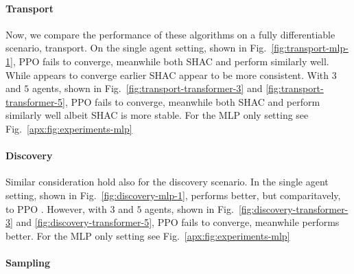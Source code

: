\paragraph{Transport}
Now, we compare the performance of these algorithms on a fully differentiable scenario, transport. On the single agent setting, shown in Fig.~\ref{fig:transport-mlp-1}, PPO fails to converge, meanwhile both SHAC and \fname{} perform similarly well. While \fname{} appears to converge earlier SHAC appear to be more consistent. With $3$ and $5$ agents, shown in Fig.~\ref{fig:transport-transformer-3} and \ref{fig:transport-transformer-5}, PPO fails to converge, meanwhile both SHAC and \fname{} perform similarly well albeit SHAC is more stable. For the MLP only setting see Fig.~\ref{apx:fig:experiments-mlp} 

\paragraph{Discovery}
Similar consideration hold also for the discovery scenario. In the single agent setting, shown in Fig.~\ref{fig:discovery-mlp-1}, \fname{} performs better, but comparitavely, to PPO . However, with $3$ and $5$ agents, shown in Fig.~\ref{fig:discovery-transformer-3} and \ref{fig:discovery-transformer-5}, PPO fails to converge, meanwhile \fname{} performs better. For the MLP only setting see Fig.~\ref{apx:fig:experiments-mlp} 

\paragraph{Sampling}


